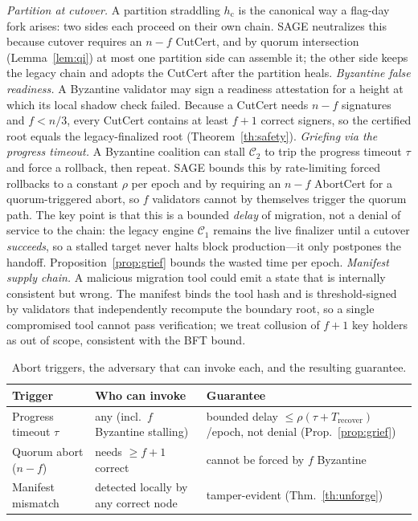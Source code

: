 \documentclass[journal]{IEEEtran}
\theoremstyle{remark}
\begin{document}
\emph{Partition at cutover.} A partition straddling $h_{\mathrm{c}}$ is the canonical way a
flag-day fork arises: two sides each proceed on their own chain. SAGE neutralizes this because
cutover requires an $n-f$ CutCert, and by quorum intersection (Lemma~\ref{lem:qi}) at most one
partition side can assemble it; the other side keeps the legacy chain and adopts the CutCert
after the partition heals. \emph{Byzantine false readiness.} A Byzantine validator may sign a
readiness attestation for a height at which its local shadow check failed. Because a CutCert
needs $n-f$ signatures and $f<n/3$, every CutCert contains at least $f+1$ correct signers, so
the certified root equals the legacy-finalized root (Theorem~\ref{th:safety}).
\emph{Griefing via the progress timeout.} A Byzantine coalition can stall $\mathcal{C}_2$ to
trip the progress timeout $\tau$ and force a rollback, then repeat. SAGE bounds this by
rate-limiting forced rollbacks to a constant $\rho$ per epoch and by requiring an $n-f$ AbortCert
for a quorum-triggered abort, so $f$ validators cannot by themselves trigger the quorum path. The
key point is that this is a bounded \emph{delay} of migration, not a denial of service to the chain:
the legacy engine $\mathcal{C}_1$ remains the live finalizer until a cutover \emph{succeeds}, so a
stalled target never halts block production---it only postpones the handoff. Proposition~\ref{prop:grief}
bounds the wasted time per epoch. \emph{Manifest supply chain.} A
malicious migration tool could emit a state that is internally consistent but wrong. The
manifest binds the tool hash and is threshold-signed by validators that independently
recompute the boundary root, so a single compromised tool cannot pass verification; we treat
collusion of $f+1$ key holders as out of scope, consistent with the BFT bound.

\begin{table}[t]
\centering
\caption{Abort triggers, the adversary that can invoke each, and the resulting guarantee.}
\label{tab:abort}
\setlength{\tabcolsep}{4pt}
\renewcommand{\arraystretch}{1.2}
\footnotesize
\begin{tabular}{p{}p{}p{}}
\toprule
Trigger & Who can invoke & Guarantee \\
\midrule
Progress timeout $\tau$ & any (incl.\ $f$ Byzantine stalling) & bounded delay $\le\rho(\tau{+}T_{\mathrm{recover}})$/epoch, not denial (Prop.~\ref{prop:grief}) \\
Quorum abort ($n{-}f$) & needs $\ge f{+}1$ correct & cannot be forced by $f$ Byzantine \\
Manifest mismatch & detected locally by any correct node & tamper-evident (Thm.~\ref{th:unforge}) \\
\bottomrule
\end{tabular}
\end{table}
\end{document}
